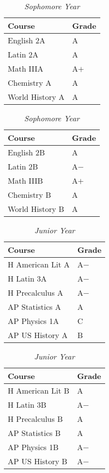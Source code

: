 \documentclass[11pt]{article}
\renewcommand{\it}[1]{\textit{{#1}}}
\begin{document}
\begin{table}[H]
    \centering
    \caption*{\it{Sophomore Year}}
    \vspace{-0.8em}
    \begin{tabular}{l|l}
        Course          & Grade \\
        \hline
        English 2A      & A   \\
        Latin 2A        & A   \\
        Math IIIA       & A$+$  \\
        Chemistry A     & A   \\
        World History A & A   \\
    \end{tabular}
    \hspace{2em}
    \begin{tabular}{l|l}
        Course          & Grade \\
        \hline
        English 2B      & A   \\
        Latin 2B        & A$-$  \\
        Math IIIB       & A$+$  \\
        Chemistry B     & A   \\
        World History B & A   \\
    \end{tabular}
    \vspace{-1em}
\end{table}

\begin{table}[H]
    \centering
    \caption*{\it{Junior Year}}
    \vspace{-0.8em}
    \begin{tabular}{l|l}
        Course           & Grade \\
        \hline
        H American Lit A & A$-$ \\
        H Latin 3A       & A$-$ \\
        H Precalculus A  & A$-$ \\
        AP Statistics A  & A  \\
        AP Physics 1A    & C  \\
        AP US History A  & B  \\
    \end{tabular}
    \hspace{2em}
    \begin{tabular}{l|l}
        Course       & Grade \\
        \hline
        H American Lit B & A   \\
        H Latin 3B       & A$-$  \\
        H Precalculus B  & A   \\
        AP Statistics B  & A   \\
        AP Physics 1B    & A$-$  \\
        AP US History B  & A$-$  \\
    \end{tabular}
    \vspace{-1em}
\end{table}
\end{document}
